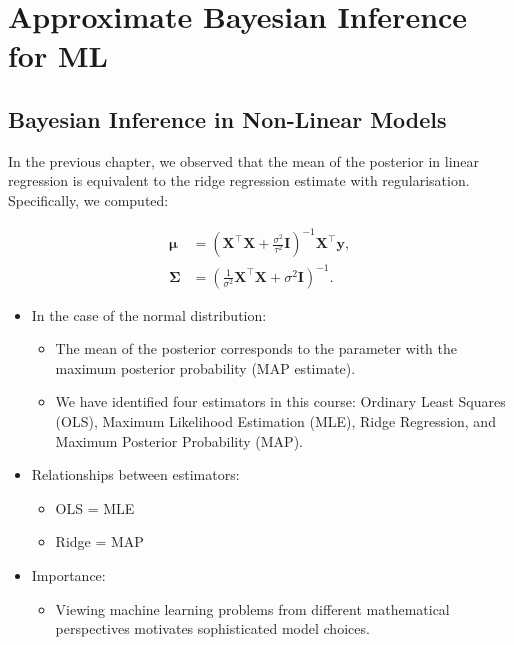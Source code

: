 \chapter{Approximate Bayesian Inference for ML}
\section{Bayesian Inference in Non-Linear Models}

In the previous chapter, we observed that the mean of the posterior in linear regression is equivalent to the ridge regression estimate with regularisation. Specifically, we computed:

\[
\begin{aligned}
\boldsymbol{\mu} &= \left(\boldsymbol{X}^{\top}\boldsymbol{X} + \frac{\sigma^{2}}{\tau^{2}}\mathbf{I}\right)^{-1}\boldsymbol{X}^{\top}\boldsymbol{y}, \\
\boldsymbol{\Sigma} &= \left(\frac{1}{\sigma^{2}}\boldsymbol{X}^{\top}\boldsymbol{X} + \sigma^{2}\mathbf{I}\right)^{-1}.
\end{aligned}
\]

\begin{itemize}
    \item In the case of the normal distribution:
    \begin{itemize}
        \item The mean of the posterior corresponds to the parameter with the maximum posterior probability (MAP estimate).
        \item We have identified four estimators in this course: Ordinary Least Squares (OLS), Maximum Likelihood Estimation (MLE), Ridge Regression, and Maximum Posterior Probability (MAP).
    \end{itemize}
    \item Relationships between estimators:
    \begin{itemize}
        \item OLS = MLE
        \item Ridge = MAP
    \end{itemize}
    \item Importance:
    \begin{itemize}
        \item Viewing machine learning problems from different mathematical perspectives motivates sophisticated model choices.
    \end{itemize}
\end{itemize}

